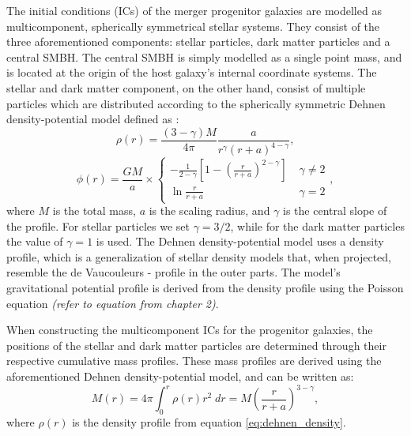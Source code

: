\documentclass[english, oneside]{HYgradu}
\begin{document}
The initial conditions (ICs) of the merger progenitor galaxies are modelled as multicomponent, spherically symmetrical stellar systems. They consist of the three aforementioned components: stellar particles, dark matter particles and a central SMBH. The central SMBH is simply modelled as a single point mass, and is located at the origin of the host galaxy's internal coordinate systems. The stellar and dark matter component, on the other hand, consist of multiple particles which are distributed according to the spherically symmetric Dehnen density-potential model defined as \citep{Dehnen1993}:
\begin{equation}
\rho(r) = \frac{(3-\gamma)M}{4\pi} \frac{a}{r^\gamma (r+a)^{4-\gamma}}, \label{eq:dehnen_density}
\end{equation}
\begin{equation}
\phi(r) = \frac{GM}{a} \times 
\begin{cases}
	-\frac{1}{2-\gamma} \left[ 1 - \left( \frac{r}{r+a} \right)^{2-\gamma} \right] & \; \gamma \neq 2 \\
	\ln \frac{r}{r+a}	 & \; \gamma = 2
\end{cases},
\label{eq:dehnen_potential}
\end{equation}
where $M$ is the total mass, $a$ is the scaling radius, and $\gamma$ is the central slope of the profile. For stellar particles we set $\gamma = 3/2$, while for the dark matter particles the value of $\gamma = 1$ is used. The Dehnen density-potential model uses a density profile, which is a generalization of stellar density models that, when projected, resemble the de Vaucouleurs - profile \citep[$\log(\mu) \propto R^{1/4}$;][]{deVaucouleurs1948} in the outer parts. The model's gravitational potential profile is derived from the density profile using the Poisson equation \textit{(refer to equation from chapter 2)}. 

When constructing the multicomponent ICs for the progenitor galaxies, the positions of the stellar and dark matter particles are determined through their respective cumulative mass profiles. These mass profiles are derived using the aforementioned Dehnen density-potential model, and can be written as:
\begin{equation}
M(r) = 4\pi \int^r_0 \rho(r)r^2 \;dr = M \left( \frac{r}{r+a} \right)^{3-\gamma}, \label{eq:cumulative_mass}
\end{equation}
where $\rho(r)$ is the density profile from equation \ref{eq:dehnen_density}.
\end{document}
